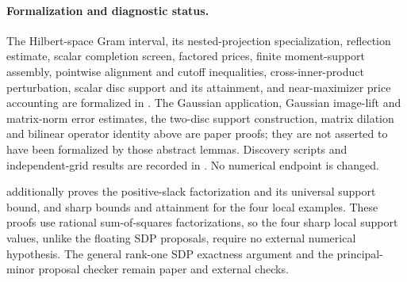 \paragraph{Formalization and diagnostic status.}
The Hilbert-space Gram interval, its nested-projection specialization,
reflection estimate, scalar completion screen, factored prices, finite
moment-support assembly, pointwise alignment and cutoff inequalities,
cross-inner-product perturbation, scalar disc support and its attainment,
and near-maximizer price accounting are formalized in
. The Gaussian application,
Gaussian image-lift and matrix-norm error estimates, the two-disc support
construction, matrix dilation and bilinear operator
identity above are paper proofs; they are not asserted to have been formalized
by those abstract lemmas. Discovery scripts and independent-grid results are
recorded in .
No numerical endpoint is changed.

 additionally proves the positive-slack factorization and
its universal support bound, and sharp bounds and attainment for the four local
examples. These proofs use rational sum-of-squares factorizations, so the four
sharp local support values, unlike the floating SDP proposals, require no
external numerical hypothesis. The general rank-one SDP exactness argument
and the principal-minor proposal checker remain paper and external checks.
